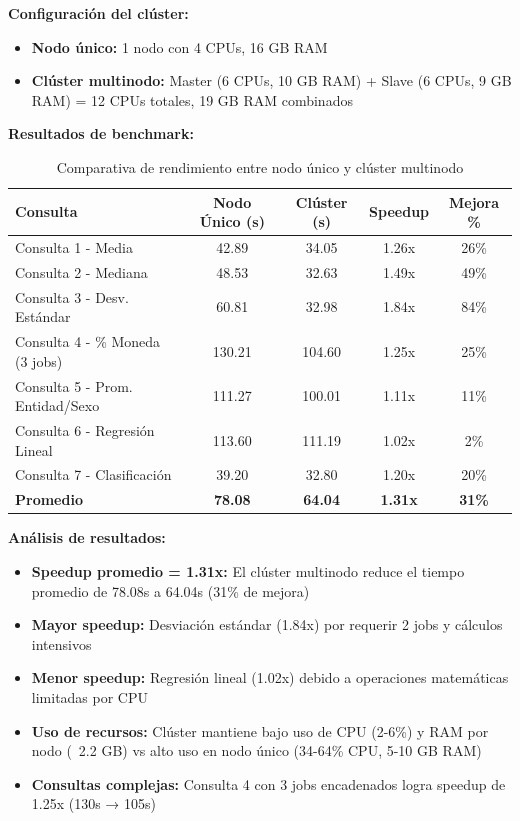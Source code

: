 \documentclass[12pt,a4paper]{article}
\begin{document}
\textbf{Configuración del clúster:}
\begin{itemize}
    \item \textbf{Nodo único:} 1 nodo con 4 CPUs, 16 GB RAM
    \item \textbf{Clúster multinodo:} Master (6 CPUs, 10 GB RAM) + Slave (6 CPUs, 9 GB RAM) = 12 CPUs totales, 19 GB RAM combinados
\end{itemize}

\textbf{Resultados de benchmark:}

\begin{table}[H]
\centering
\small
\begin{tabular}{lcccc}
\toprule
\textbf{Consulta} & \textbf{Nodo Único (s)} & \textbf{Clúster (s)} & \textbf{Speedup} & \textbf{Mejora \%} \\
\midrule
Consulta 1 - Media & 42.89 & 34.05 & 1.26x & 26\% \\
Consulta 2 - Mediana & 48.53 & 32.63 & 1.49x & 49\% \\
Consulta 3 - Desv. Estándar & 60.81 & 32.98 & 1.84x & 84\% \\
\midrule
Consulta 4 - \% Moneda (3 jobs) & 130.21 & 104.60 & 1.25x & 25\% \\
Consulta 5 - Prom. Entidad/Sexo & 111.27 & 100.01 & 1.11x & 11\% \\
\midrule
Consulta 6 - Regresión Lineal & 113.60 & 111.19 & 1.02x & 2\% \\
Consulta 7 - Clasificación & 39.20 & 32.80 & 1.20x & 20\% \\
\midrule
\textbf{Promedio} & \textbf{78.08} & \textbf{64.04} & \textbf{1.31x} & \textbf{31\%} \\
\bottomrule
\end{tabular}
\caption{Comparativa de rendimiento entre nodo único y clúster multinodo}
\label{tab:benchmark}
\end{table}

\textbf{Análisis de resultados:}

\begin{itemize}
    \item \textbf{Speedup promedio = 1.31x:} El clúster multinodo reduce el tiempo promedio de 78.08s a 64.04s (31\% de mejora)
    \item \textbf{Mayor speedup:} Desviación estándar (1.84x) por requerir 2 jobs y cálculos intensivos
    \item \textbf{Menor speedup:} Regresión lineal (1.02x) debido a operaciones matemáticas limitadas por CPU
    \item \textbf{Uso de recursos:} Clúster mantiene bajo uso de CPU (2-6\%) y RAM por nodo (~2.2 GB) vs alto uso en nodo único (34-64\% CPU, 5-10 GB RAM)
    \item \textbf{Consultas complejas:} Consulta 4 con 3 jobs encadenados logra speedup de 1.25x (130s → 105s)
\end{itemize}
\end{document}
